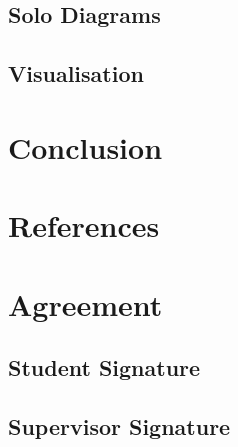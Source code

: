 \documentclass{article}
\begin{document}
        \subsection{Solo Diagrams}
        \subsection{Visualisation}

    \section{Conclusion}

    \section{References}
        

    \section{Agreement}
        \subsection{Student Signature}
            \vspace{1in}

        \subsection{Supervisor Signature}
            \vspace{1in}
\end{document}
